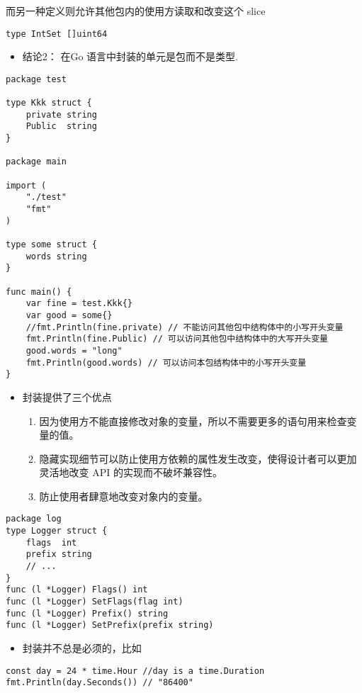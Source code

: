 而另一种定义则允许其他包内的使用方读取和改变这个 slice

\begin{verbatim}
type IntSet []uint64
\end{verbatim}

\begin{itemize}
\tightlist
\item
  结论2： 在Go 语言中封装的单元是包而不是类型.
\end{itemize}

\begin{verbatim}
package test

type Kkk struct {
    private string
    Public  string
}

package main

import (
    "./test"
    "fmt"
)

type some struct {
    words string
}

func main() {
    var fine = test.Kkk{}
    var good = some{}
    //fmt.Println(fine.private) // 不能访问其他包中结构体中的小写开头变量
    fmt.Println(fine.Public) // 可以访问其他包中结构体中的大写开头变量
    good.words = "long"
    fmt.Println(good.words) // 可以访问本包结构体中的小写开头变量
}
\end{verbatim}

\begin{itemize}
\tightlist
\item
  封装提供了三个优点

  \begin{enumerate}
  \def\labelenumi{\arabic{enumi}.}
  \tightlist
  \item
    因为使用方不能直接修改对象的变量，所以不需要更多的语句用来检查变量的值。
  \item
    隐藏实现细节可以防止使用方依赖的属性发生改变，使得设计者可以更加灵活地改变
    API 的实现而不破坏兼容性。
  \item
    防止使用者肆意地改变对象内的变量。
  \end{enumerate}
\end{itemize}

\begin{verbatim}
package log
type Logger struct {
    flags  int
    prefix string
    // ...
}
func (l *Logger) Flags() int
func (l *Logger) SetFlags(flag int)
func (l *Logger) Prefix() string
func (l *Logger) SetPrefix(prefix string)
\end{verbatim}

\begin{itemize}
\tightlist
\item
  封装并不总是必须的，比如
\end{itemize}

\begin{verbatim}
const day = 24 * time.Hour //day is a time.Duration
fmt.Println(day.Seconds()) // "86400"
\end{verbatim}
